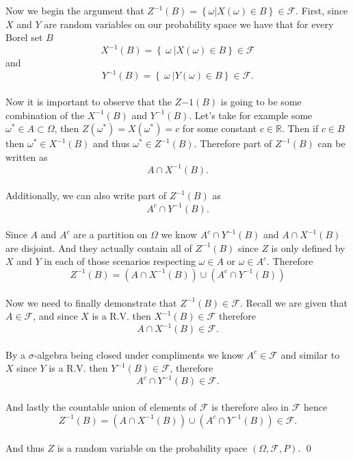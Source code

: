\documentclass[10pt]{amsart}
\begin{document}
Now we begin the argument that $Z^{-1}(B) = \left\{ \omega | X(\omega) \in B \right\} \in \mathcal{F}.$
First, since $X$ and $Y$ are random variables on our probability space we have that for every Borel set $B$ \\
$$
X^{-1}(B) = \left\{\: \omega\: | X(\omega) \in B \right\} \in \mathcal{F}
$$
and
$$
Y^{-1}(B) = \left\{\: \omega\: | Y(\omega) \in B \right\} \in \mathcal{F}.
$$ \\
Now it is important to observe that the $Z{-1}(B)$ is going to be some combination of the $X^{-1}(B)$ and $Y^{-1}(B)$. Let's take for example some $\omega^* \in A \subset \Omega$, then $Z(\omega^*) = X(\omega^*) = c$ for some constant $c \in \mathbb{R}$. Then if $c \in B$ then $\omega^* \in X^{-1}(B)$ and thus $\omega^* \in Z^{-1}(B)$. Therefore part of $Z^{-1}(B)$ can be written as \\
$$A \cap X^{-1}(B).$$ \\
Additionally, we can also write part of $Z^{-1}(B)$ as \\ 
$$A^c \cap Y^{-1}(B).$$ \\
Since $A$ and $A^c$ are a partition on $\Omega$ we know $A^c \cap Y^{-1}(B)$ and $A \cap X^{-1}(B)$ are disjoint.
And they actually contain all of $Z^{-1}(B)$ since $Z$ is only defined by $X$ and $Y$ in each of those scenarios respecting $\omega \in A$ or $\omega \in A^c$.
Therefore\\
$$
Z^{-1}(B) = \left( A \cap X^{-1}(B) \right) \cup \left(A^c \cap Y^{-1}(B) \right)
$$ \\
Now we need to finally demonstrate that $Z^{-1}(B) \in \mathcal{F}$.
Recall we are given that $A \in \mathcal{F}$, and since $X$ is a R.V. then $X^{-1}(B) \in \mathcal{F}$ therefore\\ $$ A \cap X^{-1}(B) \in \mathcal{F}.$$ \\
By a $\sigma$-algebra being closed under compliments we know $A^c \in \mathcal{F}$ and similar to $X$ since $Y$ is a R.V. then $Y^{-1}(B) \in \mathcal{F}$, therefore\\ $$A^c \cap Y^{-1}(B) \in \mathcal{F}. $$ \\
And lastly the countable union of elements of $\mathcal{F}$ is therefore also in $\mathcal{F}$ hence \\
$$
Z^{-1}(B) = \left( A \cap X^{-1}(B) \right) \cup \left(A^c \cap Y^{-1}(B) \right) \in \mathcal{F}.
$$ \\
And thus $Z$ is a random variable on the probability space $(\Omega, \mathcal{F},P)$.
\qed
\\
\end{document}
